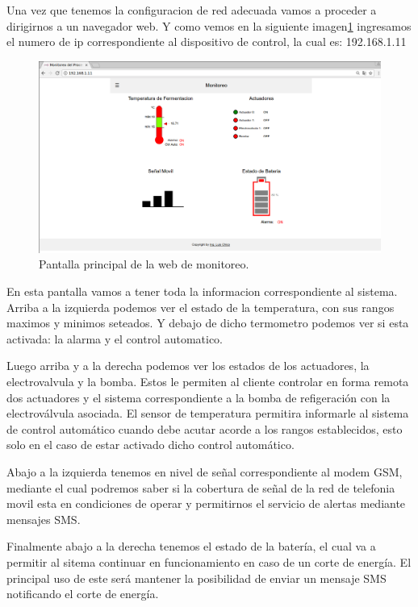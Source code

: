 Una vez que tenemos la configuracion de red adecuada vamos a proceder a dirigirnos a un navegador web. Y como vemos en la siguiente imagen\ref{fig:web_monitoreo} ingresamos el numero de ip correspondiente al dispositivo de control, la cual es: 192.168.1.11 

\begin{figure}[h]
  \centering
  \includegraphics[scale=.25]{./Figures/web_monitoreo.png}
  \caption{Pantalla principal de la web de monitoreo.}
  \label{fig:web_monitoreo}
\end{figure}

En esta pantalla vamos a tener toda la informacion correspondiente al sistema. Arriba a la izquierda podemos ver el estado de la temperatura, con sus rangos maximos y minimos seteados. Y debajo de dicho termometro podemos ver si esta activada: la alarma y el control automatico.

Luego arriba y a la derecha podemos ver los estados de los actuadores, la electrovalvula y la bomba. Estos le permiten al cliente controlar en forma remota dos actuadores y el sistema correspondiente a la bomba de refigeración con la electroválvula asociada. El sensor de temperatura permitira informarle al sistema de control automático cuando debe acutar acorde a los rangos establecidos, esto solo en el caso de estar activado dicho control automático. 

Abajo a la izquierda tenemos en nivel de señal correspondiente al modem GSM, mediante el cual podremos saber si la cobertura de señal de la red de telefonia movil esta en condiciones de operar y permitirnos el servicio de alertas mediante mensajes SMS. 

Finalmente abajo a la derecha tenemos el estado de la batería, el cual va a permitir al sitema continuar en funcionamiento en caso de un corte de energía. El principal uso de este será mantener la posibilidad de enviar un mensaje SMS notificando el corte de energía.

